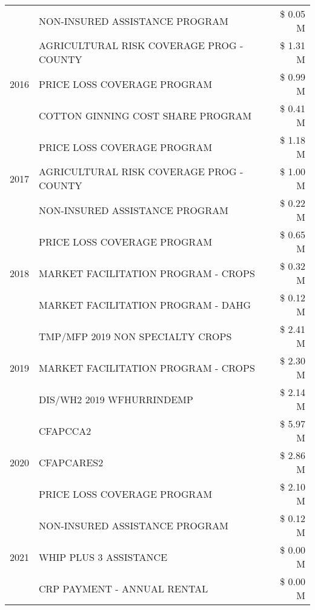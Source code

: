 \begin{tabular}{llr}
 & NON-INSURED ASSISTANCE PROGRAM & \$ 0.05 M \\
\cline{1-3}
\multirow[t]{3}{*}{2016} & AGRICULTURAL RISK COVERAGE PROG - COUNTY & \$ 1.31 M \\
 & PRICE LOSS COVERAGE PROGRAM & \$ 0.99 M \\
 & COTTON GINNING COST SHARE PROGRAM & \$ 0.41 M \\
\cline{1-3}
\multirow[t]{3}{*}{2017} & PRICE LOSS COVERAGE PROGRAM & \$ 1.18 M \\
 & AGRICULTURAL RISK COVERAGE PROG - COUNTY & \$ 1.00 M \\
 & NON-INSURED ASSISTANCE PROGRAM & \$ 0.22 M \\
\cline{1-3}
\multirow[t]{3}{*}{2018} & PRICE LOSS COVERAGE PROGRAM & \$ 0.65 M \\
 & MARKET FACILITATION PROGRAM - CROPS & \$ 0.32 M \\
 & MARKET FACILITATION PROGRAM - DAHG & \$ 0.12 M \\
\cline{1-3}
\multirow[t]{3}{*}{2019} & TMP/MFP 2019 NON SPECIALTY CROPS & \$ 2.41 M \\
 & MARKET FACILITATION PROGRAM - CROPS & \$ 2.30 M \\
 & DIS/WH2 2019 WFHURRINDEMP & \$ 2.14 M \\
\cline{1-3}
\multirow[t]{3}{*}{2020} & CFAPCCA2 & \$ 5.97 M \\
 & CFAPCARES2 & \$ 2.86 M \\
 & PRICE LOSS COVERAGE PROGRAM & \$ 2.10 M \\
\cline{1-3}
\multirow[t]{3}{*}{2021} & NON-INSURED ASSISTANCE PROGRAM & \$ 0.12 M \\
 & WHIP PLUS 3 ASSISTANCE & \$ 0.00 M \\
 & CRP PAYMENT - ANNUAL RENTAL & \$ 0.00 M \\
\cline{1-3}
\bottomrule
\end{tabular}
